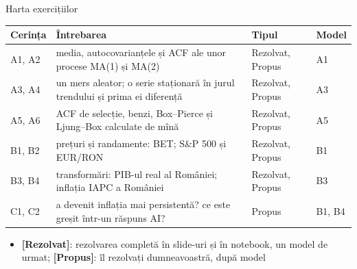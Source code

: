 \begin{frame}{Harta exercițiilor}
\itemsize{\small}
\begin{center}
\footnotesize
\begin{tabular}{>{\raggedright\arraybackslash}p{1.1cm}>{\raggedright\arraybackslash}p{7.5cm}>{\raggedright\arraybackslash}p{1.9cm}>{\raggedright\arraybackslash}p{1.4cm}}
\toprule
\textbf{Cerința} & \textbf{Întrebarea} & \textbf{Tipul} & \textbf{Model} \\
\midrule
A1, A2 & media, autocovarianțele și ACF ale unor procese MA(1) și MA(2) & Rezolvat, Propus & A1 \\
A3, A4 & un mers aleator; o serie staționară în jurul trendului și prima ei diferență & Rezolvat, Propus & A3 \\
A5, A6 & ACF de selecție, benzi, Box--Pierce și Ljung--Box calculate de mînă & Rezolvat, Propus & A5 \\
B1, B2 & prețuri și randamente: BET; S\&P 500 și EUR/RON & Rezolvat, Propus & B1 \\
B3, B4 & transformări: PIB-ul real al României; inflația IAPC a României & Rezolvat, Propus & B3 \\
C1, C2 & a devenit inflația mai persistentă? ce este greșit într-un răspuns AI? & Propus & B1, B4 \\
\bottomrule
\end{tabular}
\end{center}
\begin{itemize}
    \item \textbf{[Rezolvat]}: rezolvarea completă în slide-uri și în notebook, un model de urmat; \textbf{[Propus]}: îl rezolvați dumneavoastră, după model
\end{itemize}
\end{frame}

